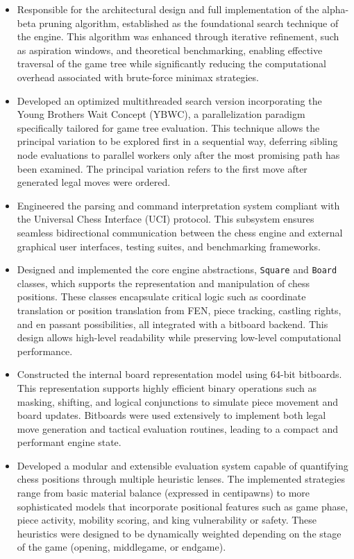 \begin{itemize}
    \item Responsible for the architectural design and full implementation of the alpha-beta pruning algorithm, established as the foundational search technique of the engine. This algorithm was enhanced through iterative refinement, such as aspiration windows, and theoretical benchmarking, enabling effective traversal of the game tree while significantly reducing the computational overhead associated with brute-force minimax strategies.

    \item Developed an optimized multithreaded search version incorporating the Young Brothers Wait Concept (YBWC), a parallelization paradigm specifically tailored for game tree evaluation. This technique allows the principal variation to be explored first in a sequential way, deferring sibling node evaluations to parallel workers only after the most promising path has been examined. The principal variation refers to the first move after generated legal moves were ordered.

    \item Engineered the parsing and command interpretation system compliant with the Universal Chess Interface (UCI) protocol. This subsystem ensures seamless bidirectional communication between the chess engine and external graphical user interfaces, testing suites, and benchmarking frameworks.

    \item Designed and implemented the core engine abstractions, \texttt{Square} and \texttt{Board} classes, which supports the representation and manipulation of chess positions. These classes encapsulate critical logic such as coordinate translation or position translation from FEN, piece tracking, castling rights, and en passant possibilities, all integrated with a bitboard backend. This design allows high-level readability while preserving low-level computational performance.

    \item Constructed the internal board representation model using 64-bit bitboards. This representation supports highly efficient binary operations such as masking, shifting, and logical conjunctions to simulate piece movement and board updates. Bitboards were used extensively to implement both legal move generation and tactical evaluation routines, leading to a compact and performant engine state.

    \item Developed a modular and extensible evaluation system capable of quantifying chess positions through multiple heuristic lenses. The implemented strategies range from basic material balance (expressed in centipawns) to more sophisticated models that incorporate positional features such as game phase, piece activity, mobility scoring, and king vulnerability or safety. These heuristics were designed to be dynamically weighted depending on the stage of the game (opening, middlegame, or endgame).


\end{itemize}
